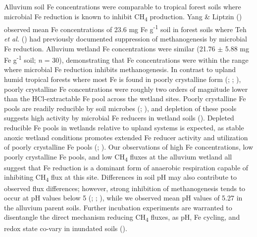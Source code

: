 \documentclass[
  12pt,
]{article}
\begin{document}
Alluvium soil Fe concentrations were comparable to tropical forest soils
where microbial Fe reduction is known to inhibit CH\textsubscript{4}
production. Yang \& Liptzin ()
observed mean Fe concentrations of 23.6 mg Fe g\textsuperscript{-1} soil
in forest soils where Teh \emph{et al.}
() had previously documented
suppression of methanogenesis by microbial Fe reduction. Alluvium
wetland Fe concentrations were similar (21.76 \(\pm\) 5.88 mg Fe
g\textsuperscript{-1} soil; \emph{n} = 30), demonstrating that Fe
concentrations were within the range where microbial Fe reduction
inhibits methanogenesis. In contrast to upland humid tropical forests
where most Fe is found in poorly crystalline form
(;
;
), poorly
crystalline Fe concentrations were roughly two orders of magnitude lower
than the HCl-extractable Fe pool across the wetland sites. Poorly
crystalline Fe pools are readily reducible by soil microbes
(;
), and depletion
of these pools suggests high activity by microbial Fe reducers in
wetland soils (). Depleted reducible Fe pools in wetlands relative to upland
systems is expected, as stable anoxic wetland conditions promotes
extended Fe reducer activity and utilization of poorly crystalline Fe
pools (;
).
Our observations of high Fe concentrations, low poorly crystalline Fe
pools, and low CH\textsubscript{4} fluxes at the alluvium wetland all
suggest that Fe reduction is a dominant form of anaerobic respiration
capable of inhibiting CH\textsubscript{4} flux at this site. Differences
in soil pH may also contribute to observed flux differences; however,
strong inhibition of methanogenesis tends to occur at pH values below 5
(;
; ), while we
observed mean pH values of 5.27 in the alluvium parent soils. Further
incubation experiments are warranted to disentangle the direct mechanism
reducing CH\textsubscript{4} fluxes, as pH, Fe cycling, and redox state
co-vary in inundated soils
().
\end{document}
